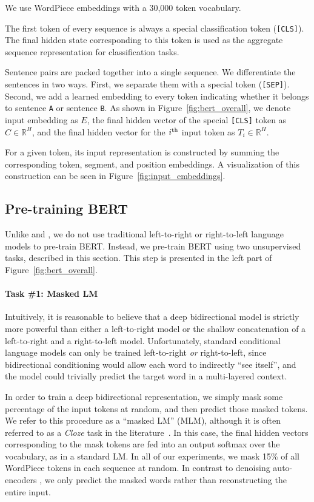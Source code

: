 We use WordPiece embeddings \cite{wu-etal:2016:_googl} with a 30,000 token vocabulary.

The first token of every sequence is always a special classification token ({\tt [CLS]}). The final hidden state corresponding to this token is used as the aggregate sequence representation for classification tasks. 

Sentence pairs are packed together into a single sequence. We differentiate the sentences in two ways. First, we separate them with a special token ({\tt [SEP]}). Second, we add a learned embedding to every token indicating whether it belongs to sentence {\tt A} or sentence {\tt B}. As shown in Figure~\ref{fig:bert_overall}, we denote input embedding as $E$, the final hidden vector of the special {\tt [CLS]} token as $C \in \mathbb{R}^{H}$, and the final hidden vector for the $i^{\rm th}$ input token as $T_i \in \mathbb{R}^H$.

For a given token, its input representation is constructed by summing the corresponding token, segment, and position embeddings. A visualization of this construction can be seen in Figure~\ref{fig:input_embeddings}.

\subsection{Pre-training BERT}
\label{sec:pretraining_tasks}

Unlike \citet{peters-etal:2018:_deep} and \citet{radford-etal:2018}, we do not use traditional left-to-right or right-to-left language models to pre-train BERT. Instead, we pre-train BERT using two unsupervised tasks, described in this section. This step is presented in the left part of Figure~\ref{fig:bert_overall}.

\paragraph{Task \#1: Masked LM} Intuitively, it is reasonable to believe that a deep bidirectional model is strictly more powerful than either a left-to-right model or the shallow concatenation of a left-to-right and a right-to-left model. Unfortunately, standard conditional language models can only be trained left-to-right {\it or} right-to-left, since bidirectional conditioning would allow each word to indirectly ``see itself'', and the model could trivially predict the target word in a multi-layered context.

In order to train a deep bidirectional representation, we simply mask some percentage of the input tokens at random, and then predict those masked tokens. We refer to this procedure as a ``masked LM'' (MLM), although it is often referred to as a {\it Cloze} task in the literature~\cite{taylor:1953:_cloze}. In this case, the final hidden vectors corresponding to the mask tokens are fed into an output softmax over the vocabulary, as in a standard LM. In all of our experiments, we mask 15\% of all WordPiece tokens in each sequence at random. In contrast to denoising auto-encoders \cite{vincent:2008}, we only predict the masked words rather than reconstructing the entire input.  

